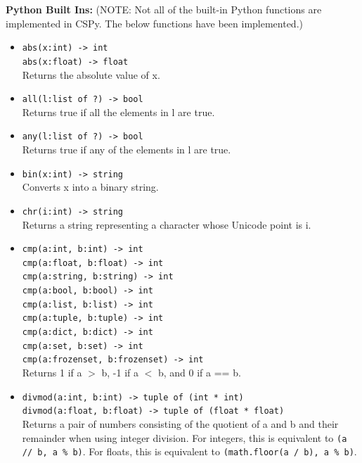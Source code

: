 \documentclass{article}
\begin{document}
\textbf{Python Built Ins:}
(NOTE: Not all of the built-in Python functions are implemented in CSPy. The below functions have been implemented.)
\begin{itemize}
\item \verb|abs(x:int) -> int| \\
      \verb|abs(x:float) -> float| \\
  Returns the absolute value of x.

\item \verb|all(l:list of ?) -> bool| \\
  Returns true if all the elements in l are true.

\item \verb|any(l:list of ?) -> bool| \\
  Returns true if any of the elements in l are true. 

\item \verb|bin(x:int) -> string| \\
 Converts x into a binary string. 

\item \verb|chr(i:int) -> string| \\
   Returns a string representing a character whose Unicode point is i.

\item \verb|cmp(a:int, b:int) -> int| \\
\verb|cmp(a:float, b:float) -> int| \\
\verb|cmp(a:string, b:string) -> int| \\
\verb|cmp(a:bool, b:bool) -> int| \\
\verb|cmp(a:list, b:list) -> int| \\
\verb|cmp(a:tuple, b:tuple) -> int| \\
\verb|cmp(a:dict, b:dict) -> int| \\
\verb|cmp(a:set, b:set) -> int| \\
\verb|cmp(a:frozenset, b:frozenset) -> int| \\
Returns 1 if a $>$ b, -1 if a $<$ b, and 0 if a == b. 

\item \verb|divmod(a:int, b:int) -> tuple of (int * int)| \\
 \verb|divmod(a:float, b:float) -> tuple of (float * float)| \\
Returns a pair of numbers consisting of the quotient of a and b and their remainder when using integer division. For integers, this is equivalent to \verb|(a // b, a % b)|. For floats, this is equivalent to \verb|(math.floor(a / b), a % b)|. 


\end{itemize}
\end{document}
